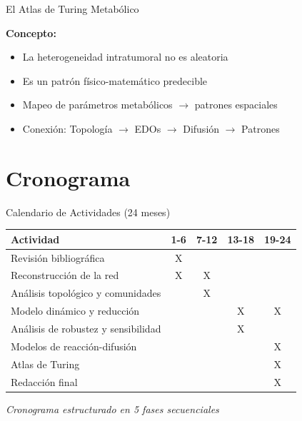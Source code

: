 \documentclass[aspectratio=169, 11pt]{beamer}
\begin{document}
	\begin{frame}{El Atlas de Turing Metabólico}
		\centering
		
		\vspace{0.3cm}
		\textbf{Concepto:}
		\begin{itemize}
			\item La heterogeneidad intratumoral no es aleatoria
			\item Es un patrón físico-matemático predecible
			\item Mapeo de parámetros metabólicos $\rightarrow$ patrones espaciales
			\item Conexión: Topología $\rightarrow$ EDOs $\rightarrow$ Difusión $\rightarrow$ Patrones
		\end{itemize}
	\end{frame}
	
	\section{Cronograma}
	\begin{frame}{Calendario de Actividades (24 meses)}
		\renewcommand{\arraystretch}{1.3}
		\begin{tabular}{lcccc}
			\toprule
			\textbf{Actividad} & \textbf{1-6} & \textbf{7-12} & \textbf{13-18} & \textbf{19-24} \\
			\midrule
			Revisión bibliográfica & \cellcolor{blue!20}X & & & \\
			Reconstrucción de la red & \cellcolor{blue!20}X & \cellcolor{blue!20}X & & \\
			Análisis topológico y comunidades & & \cellcolor{blue!20}X & & \\
			Modelo dinámico y reducción & & & \cellcolor{blue!20}X & \cellcolor{blue!20}X \\
			Análisis de robustez y sensibilidad & & & \cellcolor{blue!20}X & \\
			Modelos de reacción-difusión & & & & \cellcolor{blue!20}X \\
			Atlas de Turing & & & & \cellcolor{blue!20}X \\
			Redacción final & & & & \cellcolor{blue!20}X \\
			\bottomrule
		\end{tabular}
		
		\vspace{0.3cm}
		\centering
		\footnotesize \textit{Cronograma estructurado en 5 fases secuenciales}
	\end{frame}
	
\end{document}
